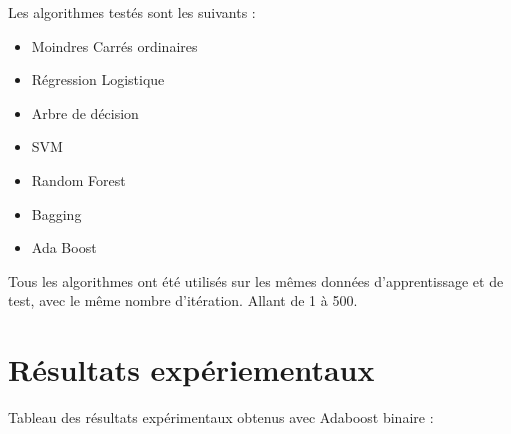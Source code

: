 \documentclass{article}
\begin{document}
Les algorithmes testés sont les suivants :
\begin{itemize}
    \item Moindres Carrés ordinaires 
    \item Régression Logistique
    \item Arbre de décision
    \item SVM
    \item Random Forest
    \item Bagging
    \item Ada Boost
\end{itemize}

Tous les algorithmes ont été utilisés sur les mêmes données d'apprentissage et de test, avec le même nombre d'itération. Allant de 1 à 500.





\section{Résultats expériementaux}
Tableau des résultats expérimentaux obtenus avec Adaboost binaire :
\end{document}
